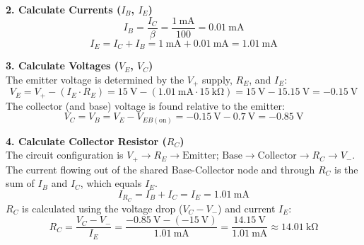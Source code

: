 \documentclass[11pt]{article}
\begin{document}
\textbf{2. Calculate Currents ($I_B$, $I_E$)}
$$
I_B = \frac{I_C}{\beta} = \frac{\SI{1}{\milli\ampere}}{100} = \SI{0.01}{\milli\ampere}
$$
$$
I_E = I_C + I_B = \SI{1}{\milli\ampere} + \SI{0.01}{\milli\ampere} = \SI{1.01}{\milli\ampere}
$$

\textbf{3. Calculate Voltages ($V_E$, $V_C$)} \\
The emitter voltage is determined by the $V_+$ supply, $R_E$, and $I_E$:
$$
V_E = V_{+} - (I_E \cdot R_E) = \SI{15}{\volt} - (\SI{1.01}{\milli\ampere} \cdot \SI{15}{\kilo\ohm}) = \SI{15}{\volt} - \SI{15.15}{\volt} = \SI{-0.15}{\volt}
$$
The collector (and base) voltage is found relative to the emitter:
$$
V_C = V_B = V_E - V_{EB(\text{on})} = \SI{-0.15}{\volt} - \SI{0.7}{\volt} = \SI{-0.85}{\volt}
$$

\textbf{4. Calculate Collector Resistor ($R_C$)} \\
The circuit configuration is $V_+ \to R_E \to \text{Emitter; Base} \to \text{Collector} \to R_C \to V_-$.
The current flowing out of the shared Base-Collector node and through $R_C$ is the sum of $I_B$ and $I_C$, which equals $I_E$.
$$
I_{R_C} = I_B + I_C = I_E = \SI{1.01}{\milli\ampere}
$$
$R_C$ is calculated using the voltage drop ($V_C - V_-$) and current $I_E$:
$$
R_C = \frac{V_C - V_{-}}{I_E} = \frac{\SI{-0.85}{\volt} - (\SI{-15}{\volt})}{\SI{1.01}{\milli\ampere}} = \frac{\SI{14.15}{\volt}}{\SI{1.01}{\milli\ampere}} \approx \SI{14.01}{\kilo\ohm}
$$
\end{document}
